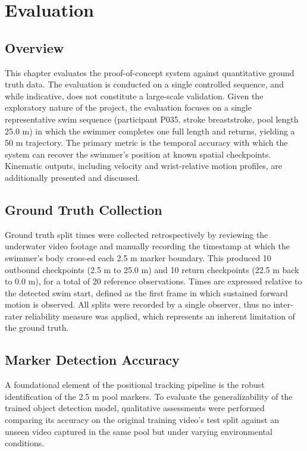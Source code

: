 \graphicspath{{content/chapters/5_Evaluation/figures/}}

\chapter{Evaluation}\label{chp:evaluation}

\section{Overview}
This chapter evaluates the proof-of-concept system against quantitative ground truth data. The evaluation is conducted on a single controlled sequence, and while indicative, does not constitute a large-scale validation. Given the exploratory nature of the project, the evaluation focuses on a single representative swim sequence (participant P035, stroke breaststroke, pool length 25.0 m) in which the swimmer completes one full length and returns, yielding a 50 m trajectory. The primary metric is the temporal accuracy with which the system can recover the swimmer's position at known spatial checkpoints. Kinematic outputs, including velocity and wrist-relative motion profiles, are additionally presented and discussed.

\section{Ground Truth Collection}
Ground truth split times were collected retrospectively by reviewing the underwater video footage and manually recording the timestamp at which the swimmer's body cross-ed each 2.5 m marker boundary. This produced 10 outbound checkpoints (2.5 m to 25.0 m) and 10 return checkpoints (22.5 m back to 0.0 m), for a total of 20 reference observations. Times are expressed relative to the detected swim start, defined as the first frame in which sustained forward motion is observed. %
All splits were recorded by a single observer, thus no inter-rater reliability measure was applied, which represents an inherent limitation of the ground truth.

\section{Marker Detection Accuracy}\label{sec:marker_detection}
A foundational element of the positional tracking pipeline is the robust identification of the 2.5 m pool markers. To evaluate the generalizability of the trained object detection model, qualitative assessments were performed comparing its accuracy on the original training video's test split against an unseen video captured in the same pool but under varying environmental conditions.

